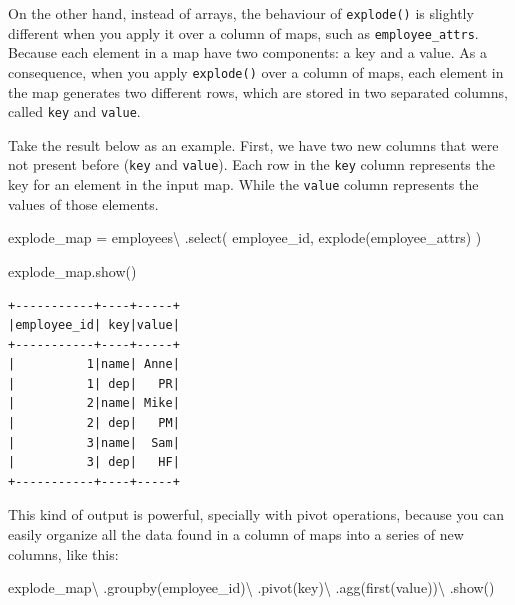 \documentclass[
  11pt,
  letterpaper,
  DIV=11,
  numbers=noendperiod]{scrreprt}
\newenvironment{Shaded}{\begin{snugshade}}{\end{snugshade}}
\newcommand{\NormalTok}[1]{\textcolor[rgb]{0.00,0.23,0.31}{#1}}
\newcommand{\OperatorTok}[1]{\textcolor[rgb]{0.37,0.37,0.37}{#1}}
\newcommand{\StringTok}[1]{\textcolor[rgb]{0.13,0.47,0.30}{#1}}
\begin{document}
On the other hand, instead of arrays, the behaviour of
\texttt{explode()} is slightly different when you apply it over a column
of maps, such as \texttt{employee\_attrs}. Because each element in a map
have two components: a key and a value. As a consequence, when you apply
\texttt{explode()} over a column of maps, each element in the map
generates two different rows, which are stored in two separated columns,
called \texttt{key} and \texttt{value}.

Take the result below as an example. First, we have two new columns that
were not present before (\texttt{key} and \texttt{value}). Each row in
the \texttt{key} column represents the key for an element in the input
map. While the \texttt{value} column represents the values of those
elements.

\begin{Shaded}
\begin{Highlighting}[]
\NormalTok{explode\_map }\OperatorTok{=}\NormalTok{ employees}\OperatorTok{\textbackslash{}}
\NormalTok{    .select(}
        \StringTok{\textquotesingle{}employee\_id\textquotesingle{}}\NormalTok{,}
\NormalTok{        explode(}\StringTok{\textquotesingle{}employee\_attrs\textquotesingle{}}\NormalTok{)}
\NormalTok{    )}

\NormalTok{explode\_map.show()}
\end{Highlighting}
\end{Shaded}

\begin{verbatim}
+-----------+----+-----+
|employee_id| key|value|
+-----------+----+-----+
|          1|name| Anne|
|          1| dep|   PR|
|          2|name| Mike|
|          2| dep|   PM|
|          3|name|  Sam|
|          3| dep|   HF|
+-----------+----+-----+
\end{verbatim}

This kind of output is powerful, specially with pivot operations,
because you can easily organize all the data found in a column of maps
into a series of new columns, like this:

\begin{Shaded}
\begin{Highlighting}[]
\NormalTok{explode\_map}\OperatorTok{\textbackslash{}}
\NormalTok{    .groupby(}\StringTok{\textquotesingle{}employee\_id\textquotesingle{}}\NormalTok{)}\OperatorTok{\textbackslash{}}
\NormalTok{    .pivot(}\StringTok{\textquotesingle{}key\textquotesingle{}}\NormalTok{)}\OperatorTok{\textbackslash{}}
\NormalTok{    .agg(first(}\StringTok{\textquotesingle{}value\textquotesingle{}}\NormalTok{))}\OperatorTok{\textbackslash{}}
\NormalTok{    .show()}
\end{Highlighting}
\end{Shaded}
\end{document}
